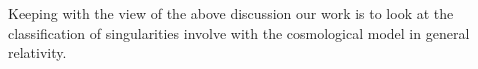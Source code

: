 \documentclass[11pt]{article}
\theoremstyle{theorem}
\theoremstyle{defi}
\begin{document}

  Keeping with the view of the above discussion our work is to look at the classification of singularities involve with the cosmological model in general relativity.
\end{document}
